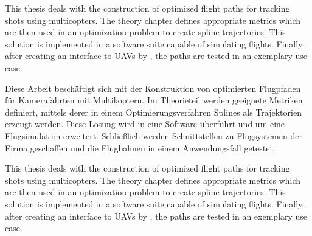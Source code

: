 \thispagestyle{scrplain}
\begin{abstractFrame}

\begin{enAbstract}
This thesis deals with the construction of optimized flight paths for tracking shots using multicopters.
The theory chapter defines appropriate metrics which are then used in an optimization problem to create spline trajectories.
This solution is implemented in a software suite capable of simulating flights.
Finally, after creating an interface to UAVs by \asctec, the paths are tested in an exemplary use case.
\end{enAbstract}

\begin{deAbstract}
Diese Arbeit beschäftigt sich mit der Konstruktion von optimierten Flugpfaden für Kamerafahrten mit Multikoptern.
Im Theorieteil werden geeignete Metriken definiert, mittels derer in einem Optimierungsverfahren Splines als Trajektorien erzeugt werden.
Diese Lösung wird in eine Software überführt und um eine Flugsimulation erweitert.
Schließlich werden Schnittstellen zu Flugsystemen der Firma \asctec geschaffen und die Flugbahnen in einem Anwendungsfall getestet.
\end{deAbstract}

\begin{svAbstract}
This thesis deals with the construction of optimized flight paths for tracking shots using multicopters.
The theory chapter defines appropriate metrics which are then used in an optimization problem to create spline trajectories.
This solution is implemented in a software suite capable of simulating flights.
Finally, after creating an interface to UAVs by \asctec, the paths are tested in an exemplary use case.
\end{svAbstract}

\end{abstractFrame}
